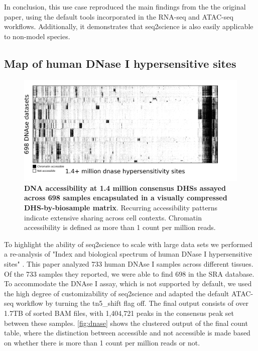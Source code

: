 In conclusion, this use case reproduced the main findings from the the original paper, using the default tools incorporated in the RNA-seq and ATAC-seq workflows. Additionally, it demonstrates that seq2science is also easily applicable to non-model species.

\subsection{Map of human DNase I hypersensitive sites}

\begin{figure}
	\centering
	\includegraphics[width=\textwidth]{ch.seq2science/imgs/dnase.png}
	\caption{\label{fig:dnase} \textbf{DNA accessibility at 1.4 million consensus DHSs assayed across 698 samples encapsulated in a visually compressed DHS-by-biosample matrix}. Recurring accessibility patterns indicate extensive sharing across cell contexts. Chromatin accessibility is defined as more than 1 count per million reads. }
\end{figure}

To highlight the ability of seq2science to scale with large data sets we performed a re-analysis of "Index and biological spectrum of human DNase I hypersensitive sites" \cite{Meuleman2020}. This paper analyzed 733 human DNAse I samples across different tissues. Of the 733 samples they reported, we were able to find 698 in the SRA database. To accommodate the DNAse I assay, which is not supported by default, we used the high degree of customizability of seq2science and adapted the default ATAC-seq workflow by turning the tn5\_shift flag off. The final output consists of over 1.7TB of sorted BAM files, with 1,404,721 peaks in the consensus peak set between these samples. \autoref{fig:dnase} shows the clustered output of the final count table, where the distinction between accessible and not accessible is made based on whether there is more than 1 count per million reads or not.

